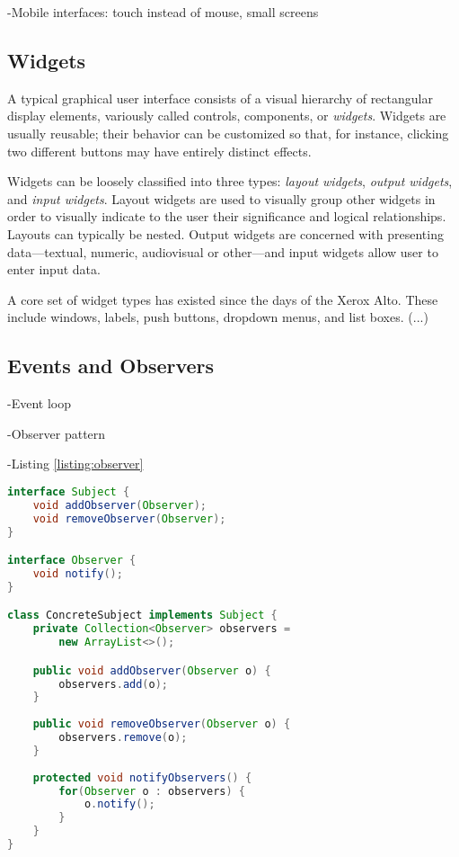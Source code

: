 -Mobile interfaces: touch instead of mouse, small screens

\subsection{Widgets}

A typical graphical user interface consists of a visual hierarchy of rectangular display elements, variously called controls, components, or \emph{widgets}. Widgets are usually reusable; their behavior can be customized so that, for instance, clicking two different buttons may have entirely distinct effects.

Widgets can be loosely classified into three types: \emph{layout widgets}, \emph{output widgets}, and \emph{input widgets}. Layout widgets are used to visually group other widgets in order to visually indicate to the user their significance and logical relationships. Layouts can typically be nested. Output widgets are concerned with presenting data---textual, numeric, audiovisual or other---and input widgets allow user to enter input data.

A core set of widget types has existed since the days of the Xerox Alto. These include windows, labels, push buttons, dropdown menus, and list boxes. (...)

\subsection{Events and Observers}

-Event loop

-Observer pattern \cite{GoF}

-Listing \ref{listing:observer}

\begin{code}
\begin{lstlisting}[language=Java,caption=An implementation of the observer pattern.\label{listing:observer}]
interface Subject {
    void addObserver(Observer);
    void removeObserver(Observer);
}

interface Observer {
    void notify();
}

class ConcreteSubject implements Subject {
    private Collection<Observer> observers = 
        new ArrayList<>();

    public void addObserver(Observer o) {
        observers.add(o);
    }
    
    public void removeObserver(Observer o) {
        observers.remove(o);
    }
    
    protected void notifyObservers() {
        for(Observer o : observers) {
            o.notify();
        }
    }
}


\end{lstlisting}
\end{code}


